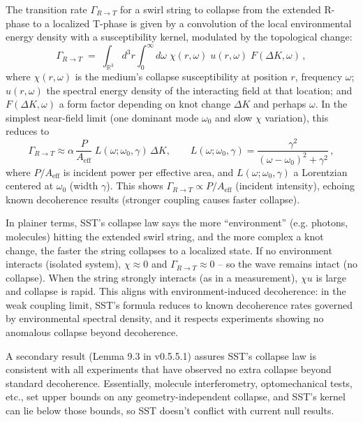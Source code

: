 \documentclass[10pt,reprint,aps,onecolumn,nofootinbib]{revtex4-2}
\begin{document}
    \begin{tcolorbox}[title=Theorem 8.1: R$\to$T Transition Dynamics (Collapse Rate)]
        The transition rate $\Gamma_{R\to T}$ for a swirl string to collapse from the extended R-phase to a localized T-phase is given by a convolution of the local environmental energy density with a susceptibility kernel, modulated by the topological change:
        \[
            \Gamma_{R\to T} \;=\; \int_{\mathbb{R}^3}\! d^3r \int_0^{\infty}\! d\omega\;\chi(r,\omega)\;u(r,\omega)\;F(\Delta K,\omega)\,,
        \]
        where $\chi(r,\omega)$ is the medium’s collapse susceptibility at position $r$, frequency $\omega$; $u(r,\omega)$ the spectral energy density of the interacting field at that location; and $F(\Delta K,\omega)$ a form factor depending on knot change $\Delta K$ and perhaps $\omega$. In the simplest near-field limit (one dominant mode $\omega_0$ and slow $\chi$ variation), this reduces to
        \[
            \Gamma_{R\to T} \approx \alpha\, \frac{P}{A_{\text{eff}}}\; L(\omega; \omega_0,\gamma)\,\Delta K, \qquad
            L(\omega; \omega_0,\gamma) = \frac{\gamma^2}{(\omega-\omega_0)^2+\gamma^2}\,,
        \]
        where $P/A_{\text{eff}}$ is incident power per effective area, and $L(\omega; \omega_0,\gamma)$ a Lorentzian centered at $\omega_0$ (width $\gamma$). This shows $\Gamma_{R\to T} \propto P/A_{\text{eff}}$ (incident intensity), echoing known decoherence results (stronger coupling causes faster collapse).
    \end{tcolorbox}

    \noindent In plainer terms, SST’s collapse law says the more “environment” (e.g. photons, molecules) hitting the extended swirl string, and the more complex a knot change, the faster the string collapses to a localized state. If no environment interacts (isolated system), $\chi \approx 0$ and $\Gamma_{R\to T}\approx 0$ – so the wave remains intact (no collapse). When the string strongly interacts (as in a measurement), $\chi u$ is large and collapse is rapid. This aligns with environment-induced decoherence: in the weak coupling limit, SST’s formula reduces to known decoherence rates governed by environmental spectral density, and it respects experiments showing no anomalous collapse beyond decoherence.

    A secondary result (Lemma 9.3 in v0.5.5.1) assures SST’s collapse law is consistent with all experiments that have observed no extra collapse beyond standard decoherence. Essentially, molecule interferometry, optomechanical tests, etc., set upper bounds on any geometry-independent collapse, and SST’s kernel can lie below those bounds, so SST doesn’t conflict with current null results.
\end{document}
